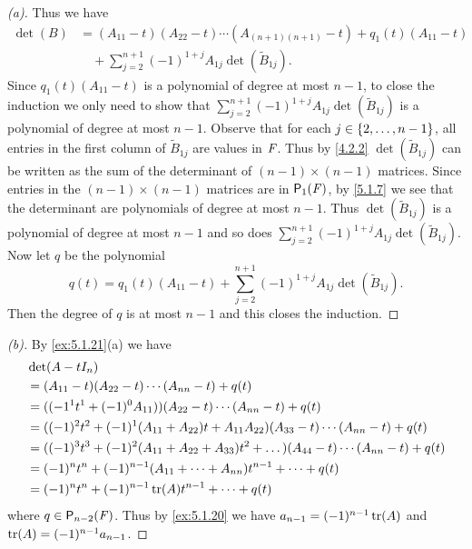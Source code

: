 \begin{proof}[(a)]
  Thus we have
  \begin{align*}
    \det(B) & = (A_{1 1} - t) (A_{2 2} - t) \cdots (A_{(n + 1) (n + 1)} - t) + q_1(t) (A_{1 1} - t) \\
            & \quad + \sum_{j = 2}^{n + 1} (-1)^{1 + j} A_{1 j} \det(\tilde{B}_{1 j}).
  \end{align*}
  Since \(q_1(t) (A_{1 1} - t)\) is a polynomial of degree at most \(n - 1\),  to close the induction we only need to show that \(\sum_{j = 2}^{n + 1} (-1)^{1 + j} A_{1 j} \det(\tilde{B}_{1 j})\) is a polynomial of degree at most \(n - 1\).
  Observe that for each \(j \in \left\lbrace2, \dots, n - 1\right\rbrace\), all entries in the first column of \(\tilde{B}_{1 j}\) are values in \(\mathit{F}\).
  Thus by \cref{4.2.2} \(\det(\tilde{B}_{1 j})\) can be written as the sum of the determinant of \((n - 1) \times (n - 1)\) matrices.
  Since entries in the \((n - 1) \times (n - 1)\) matrices are in \(\ps[1]{\F}\), by \cref{5.1.7} we see that the determinant are polynomials of degree at most \(n - 1\).
  Thus \(\det(\tilde{B}_{1 j})\) is a polynomial of degree at most \(n - 1\) and so does \(\sum_{j = 2}^{n + 1} (-1)^{1 + j} A_{1 j} \det(\tilde{B}_{1 j})\).
  Now let \(q\) be the polynomial
  \[
    q(t) = q_1(t) (A_{1 1} - t) + \sum_{j = 2}^{n + 1} (-1)^{1 + j} A_{1 j} \det(\tilde{B}_{1 j}).
  \]
  Then the degree of \(q\) is at most \(n - 1\) and this closes the induction.
\end{proof}

\begin{proof}[(b)]
  By \cref{ex:5.1.21}(a) we have
  \begin{align*}
     & \det(A - t I_n)                                                                                             \\
     & = (A_{1 1} - t) (A_{2 2} - t) \cdots (A_{n n} - t) + q(t)                                                   \\
     & = ((-1^1 t^1 + (-1)^0 A_{1 1})) (A_{2 2} - t) \cdots (A_{n n} - t) + q(t)                                   \\
     & = ((-1)^2 t^2 + (-1)^1 (A_{1 1} + A_{2 2}) t + A_{1 1} A_{2 2}) (A_{3 3} - t) \cdots (A_{n n} - t) + q(t)   \\
     & = ((-1)^3 t^3 + (-1)^2 (A_{1 1} + A_{2 2} + A_{3 3}) t^2 + \dots) (A_{4 4} - t) \cdots (A_{n n} - t) + q(t) \\
     & = (-1)^n t^n + (-1)^{n - 1} (A_{1 1} + \cdots + A_{n n}) t^{n - 1} + \cdots + q(t)                          \\
     & = (-1)^n t^n + (-1)^{n - 1} \tr(A) t^{n - 1} + \cdots + q(t)
  \end{align*}
  where \(q \in \ps[n - 2]{\F}\).
  Thus by \cref{ex:5.1.20} we have \(a_{n - 1} = (-1)^{n - 1} \tr(A)\) and \(\tr(A) = (-1)^{n - 1} a_{n - 1}\).
\end{proof}

